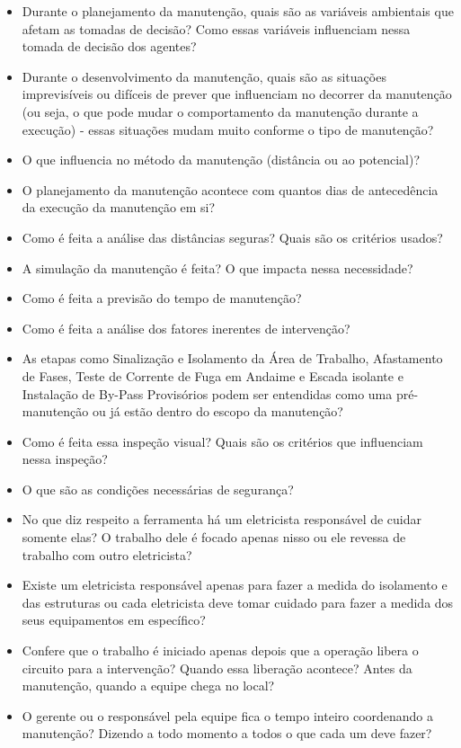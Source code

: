\begin{itemize}
\item Durante o planejamento da manutenção, quais são as variáveis ambientais que afetam as tomadas de decisão? Como essas variáveis influenciam nessa tomada de decisão dos agentes?
\item Durante o desenvolvimento da manutenção, quais são as situações imprevisíveis ou difíceis de prever que influenciam no decorrer da manutenção (ou seja, o que pode mudar o comportamento da manutenção durante a execução) - essas situações mudam muito conforme o tipo de manutenção?
\item O que influencia no método da manutenção (distância ou ao potencial)?
\item O planejamento da manutenção acontece com quantos dias de antecedência da execução da manutenção em si?
\item Como é feita a análise das distâncias seguras? Quais são os critérios usados?
\item A simulação da manutenção é feita? O que impacta nessa necessidade?  
\item Como é feita a previsão do tempo de manutenção? 
\item Como é feita a análise dos fatores inerentes de intervenção?  
\item As etapas como Sinalização e Isolamento da Área de Trabalho, Afastamento de Fases, Teste de Corrente de Fuga em Andaime e Escada isolante e Instalação de By-Pass Provisórios podem ser entendidas como uma pré-manutenção ou já estão dentro do escopo da manutenção?
\item Como é feita essa inspeção visual? Quais são os critérios que influenciam nessa inspeção? 
\item O que são as condições necessárias de segurança? 
\item No que diz respeito a ferramenta há um eletricista responsável de cuidar somente elas? O trabalho dele é focado apenas nisso ou ele revessa de trabalho com outro eletricista? 
\item Existe um eletricista responsável apenas para fazer a medida do isolamento e das estruturas ou cada eletricista deve tomar cuidado para fazer a medida dos seus equipamentos em específico?
\item Confere que o trabalho é iniciado apenas depois que a operação libera o circuito para a intervenção? Quando essa liberação acontece? Antes da manutenção, quando a equipe chega no local?
\item O gerente ou o responsável pela equipe fica o tempo inteiro coordenando a manutenção? Dizendo a todo momento a todos o que cada um deve fazer? 

\end{itemize}
